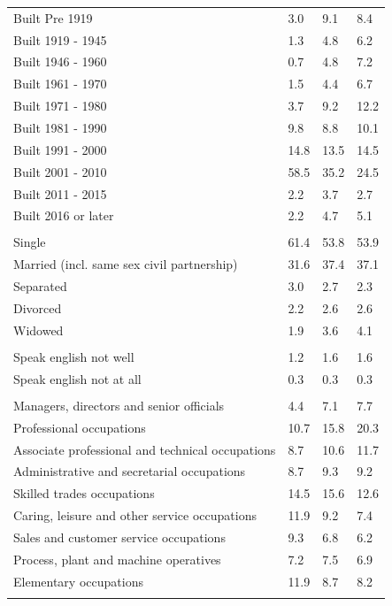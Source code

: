 \documentclass{article}
\begin{document}
\begin{table}[h]
\begin{tabular}{KTTT}
    \hline
Built Pre 1919 & 3.0& 9.1& 8.4\\
Built 1919 - 1945 & 1.3& 4.8& 6.2\\
Built  1946 - 1960 & 0.7& 4.8& 7.2\\
Built  1961 - 1970 & 1.5& 4.4& 6.7\\
Built  1971 - 1980 &  3.7&  9.2& 12.2\\
Built  1981 - 1990 &  9.8&  8.8& 10.1\\
Built  1991 - 2000 & 14.8& 13.5& 14.5\\
Built  2001 - 2010 & 58.5& 35.2& 24.5\\
Built  2011 - 2015 & 2.2& 3.7& 2.7\\
Built  2016 or later & 2.2& 4.7& 5.1\\
\hline
    \\
    \hline
Single & 61.4& 53.8& 53.9\\
Married (incl. same sex civil partnership) & 31.6& 37.4& 37.1\\
Separated  & 3.0& 2.7& 2.3\\
Divorced  & 2.2& 2.6& 2.6\\
Widowed & 1.9& 3.6& 4.1\\
\hline
    \\ 
    \hline
Speak english not well & 1.2& 1.6& 1.6\\
Speak english not at all & 0.3& 0.3& 0.3\\
\hline
    \\
    \hline
Managers, directors and senior officials & 4.4& 7.1& 7.7\\
Professional occupations & 10.7& 15.8& 20.3\\
Associate professional and technical occupations &  8.7& 10.6& 11.7\\
Administrative and secretarial occupations & 8.7& 9.3& 9.2\\
Skilled trades occupations & 14.5& 15.6& 12.6\\
Caring, leisure and other service occupations & 11.9&  9.2&  7.4\\
Sales and customer service occupations & 9.3& 6.8& 6.2\\
Process, plant and machine operatives & 7.2& 7.5& 6.9\\
Elementary occupations & 11.9&  8.7&  8.2\\
\hline
\end{tabular}
\end{table}
\end{document}
